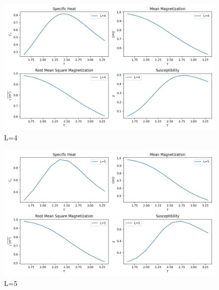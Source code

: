 \documentclass[11pt]{article}
\begin{document}
\begin{question}
  \begin{figure}[H]
    \centering
    \includegraphics[width=0.7\columnwidth]{4.png}
    \caption{L=4}
  \end{figure}
  \begin{figure}[H]
    \centering
    \includegraphics[width=0.7\columnwidth]{ising_L5.png}
    \caption{L=5}
  \end{figure}
  
\end{question}
\end{document}
